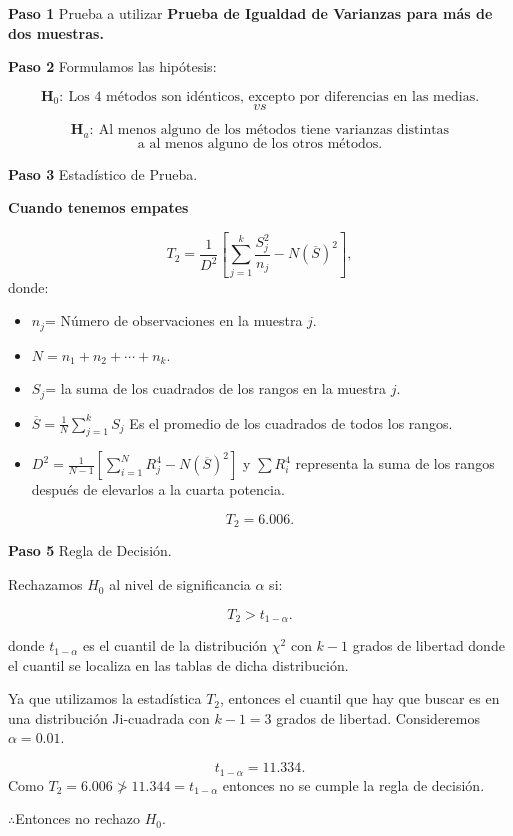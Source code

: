\documentclass[
  a4paper,
  oneside,
  openany]{book}
\begin{document}
\textbf{Paso 1} Prueba a utilizar \textbf{Prueba de Igualdad de Varianzas para más de dos muestras.}

\textbf{Paso 2} Formulamos las hipótesis:

\[\textbf{H}_0: \ \mbox{Los 4 métodos son idénticos, excepto por diferencias en las medias.}\]
\[vs\]

\[\textbf{H}_a:\ \mbox{Al menos alguno de los métodos tiene varianzas distintas}\]
\[\mbox{a al menos alguno de los otros métodos.}\]

\textbf{Paso 3} Estadístico de Prueba.

\textbf{Cuando tenemos empates}

\[T_{2}= \frac{1}{D^2}\left[\sum_{j=1}^{k}\frac{S_{j}^2}{n_j}-N(\overline{S})^2\right],\]
donde:

\begin{itemize}
\item
  \(n_{j}\)= Número de observaciones en la muestra \(j\).
\item
  \(N= n_{1}+n_{2}+\cdots+n_{k}\).
\item
  \(S_{j}\)= la suma de los cuadrados de los rangos en la muestra \(j\).
\item
  \(\overline{S}= \frac{1}{N}\sum_{j=1}^{k}S_{j}\) Es el promedio de los cuadrados de todos los rangos.
\item
  \(D^2=\frac{1}{N-1}\left[\sum_{i=1}^{N}R^4_{j}-N(\overline{S})^2\right]\) y \(\sum{R_{i}^4}\) representa la suma de los rangos después de elevarlos a la cuarta potencia.
\end{itemize}

\[T_{2}=6.006.\]

\textbf{Paso 5} Regla de Decisión.

Rechazamos \(H_0\) al nivel de significancia \(\alpha\) si:

\[T_{2}>t_{1-\alpha}.\]

donde \(t_{1-\alpha}\) es el cuantil de la distribución \(\chi^2\) con \(k-1\) grados de libertad donde el cuantil se localiza en las tablas de dicha distribución.

Ya que utilizamos la estadística \(T_2\), entonces el cuantil que hay que buscar es en una distribución Ji-cuadrada con \(k-1=3\) grados de libertad. Consideremos \(\alpha=0.01\).

\[t_{1-\alpha}=11.334.\]
Como \(T_2=6.006 \ngtr 11.344=t_{1-\alpha}\) entonces no se cumple la regla de decisión.

\(\therefore\)Entonces no rechazo \(H_0\).
\end{document}
